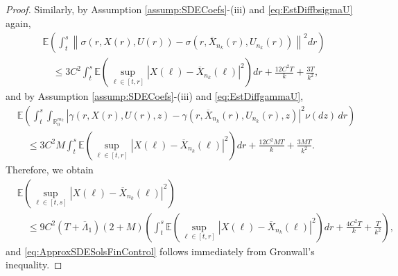 \documentclass[amscd,amssymb,11pt]{article}
\numberwithin{theorem}{section}
\numberwithin{equation}{section}
\begin{document}
\begin{proof}
Similarly, by Assumption \ref{assump:SDECoefs}-(iii) and \eqref{eq:EstDiffbsigmaU} again,
\begin{align*}
&\mathbb{E}\left(\int_{t}^{s}\left\|\sigma\left(r,X(r),U(r)\right)-\sigma\left(r,\overline{X}_{n_{k}}(r),U_{n_{k}}(r)\right)\right\|^{2}dr\right)\\
&\quad\leq 3C^{2}\int_{t}^{s}\mathbb{E}\left(\sup_{\ell\in[t,r]}\left|X(\ell)-\overline{X}_{n_{k}}(\ell)\right|^{2}\right)dr+\frac{12C^{2}T}{k}+\frac{3T}{k^{2}},
\end{align*}
and by Assumption \ref{assump:SDECoefs}-(iii) and \eqref{eq:EstDiffgammaU},
\begin{align*}
&\mathbb{E}\left(\int_{t}^{s}\int_{\mathbb{R}^{m_{2}}_{0}}\left|\gamma\left(r,X(r),U(r),z\right)-\gamma\left(r,\overline{X}_{n_{k}}(r),U_{n_{k}}(r),z\right)\right|^{2}\nu(dz)\,dr\right)\\
&\quad\leq 3C^{2}M\int_{t}^{s}\mathbb{E}\left(\sup_{\ell\in[t,r]}\left|X(\ell)-\overline{X}_{n_{k}}(\ell)\right|^{2}\right)dr+\frac{12C^{2}MT}{k}+\frac{3MT}{k^{2}}.
\end{align*}
Therefore, we obtain
\begin{align*}
&\mathbb{E}\left(\sup_{\ell\in[t,s]}\left|X(\ell)-\overline{X}_{n_{k}}(\ell)\right|^{2}\right)\\
&\quad\leq 9C^{2}\left(T+\overline{\Lambda}_{1}\right)(2+M)\left(\int_{t}^{s}\mathbb{E}\left(\sup_{\ell\in[t,r]}\left|X(\ell)-\overline{X}_{n_{k}}(\ell)\right|^{2}\right)dr+\frac{4C^{2}T}{k}+\frac{T}{k^{2}}\right),
\end{align*}
and \eqref{eq:ApproxSDESolsFinControl} follows immediately from Gronwall's inequality.
\end{proof}
\end{document}
